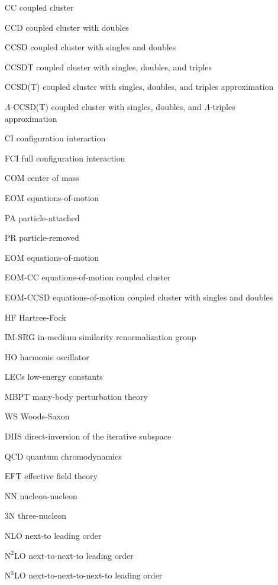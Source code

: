 \documentclass[thesis.tex]{subfiles}
\begin{document}
\begin{itemize}
\item[CC] coupled cluster
\item[CCD] coupled cluster with doubles
\item[CCSD] coupled cluster with singles and doubles
\item[CCSDT] coupled cluster with singles, doubles, and triples
\item[CCSD(T)] coupled cluster with singles, doubles, and triples approximation
\item[$\Lambda$-CCSD(T)] coupled cluster with singles, doubles, and $\Lambda$-triples approximation
\item[CI] configuration interaction
\item[FCI] full configuration interaction
\item[COM] center of mass
\item[EOM] equations-of-motion
\item[PA] particle-attached
\item[PR] particle-removed
\item[EOM] equations-of-motion
\item[EOM-CC] equations-of-motion coupled cluster
\item[EOM-CCSD] equations-of-motion coupled cluster with singles and doubles
\item[HF] Hartree-Fock
\item[IM-SRG] in-medium similarity renormalization group
\item[HO] harmonic oscillator
\item[LECs] low-energy constants
\item[MBPT] many-body perturbation theory
\item[WS] Woods-Saxon
\item[DIIS] direct-inversion of the iterative subspace
\item[QCD] quantum chromodynamics
\item[EFT] effective field theory
\item[NN] nucleon-nucleon
\item[3N] three-nucleon
\item[NLO] next-to leading order
\item[$\text{N}^{2}$LO] next-to-next-to leading order
\item[$\text{N}^{3}$LO] next-to-next-to-next-to leading order
\end{itemize}
\end{document}
